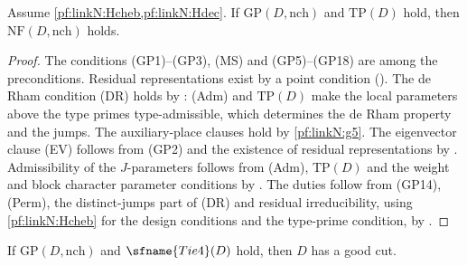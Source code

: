 \begin{theorem}\label{pf:linkN:facts}
Assume \cref{pf:linkN:Hcheb,pf:linkN:Hdec}. If $\mathrm{GP}(D,\mathrm{nch})$ and $\mathrm{TP}(D)$ hold, then $\mathrm{NF}(D,\mathrm{nch})$
holds.
\end{theorem}

\begin{proof}
The conditions (GP1)--(GP3), (MS) and (GP5)--(GP18) are among the preconditions. Residual representations exist by a point
condition (). The de Rham condition (DR) holds by
: (Adm) and $\mathrm{TP}(D)$ make the local parameters above the type
primes type-admissible, which determines the de Rham property and the jumps. The auxiliary-place clauses hold by
\cref{pf:linkN:g5}. The eigenvector clause (EV) follows from (GP2) and the existence of residual representations by
. Admissibility of the $J$-parameters follows from (Adm), $\mathrm{TP}(D)$ and the
weight and block character parameter conditions by . The duties follow from (GP14),
(Perm), the distinct-jumps part of (DR) and residual irreducibility, using \cref{pf:linkN:Hcheb} for the design conditions and the
type-prime condition, by .
\end{proof}

\begin{proposition}\label{pf:linkN:existsgood}
If $\mathrm{GP}(D,\mathrm{nch})$ and $\sfname{Tie4}(D)$ hold, then $D$ has a good cut.
\end{proposition}

